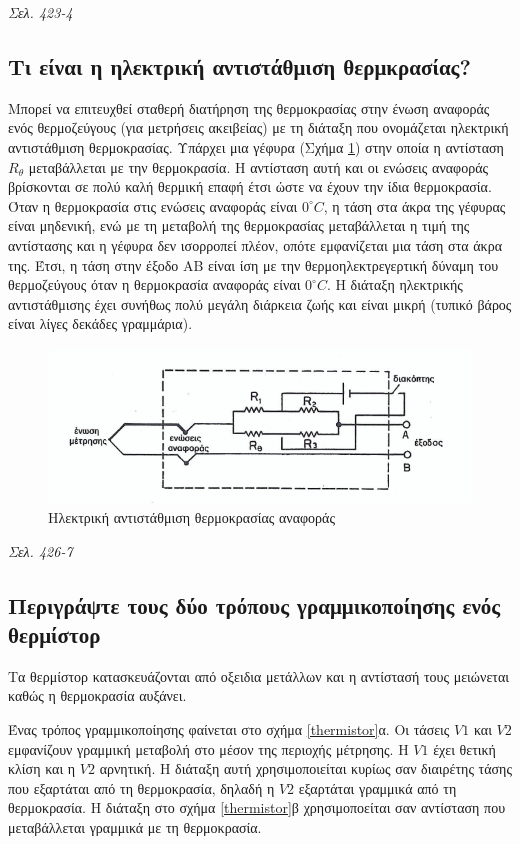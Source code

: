 \documentclass{article}
\begin{document}
\emph{Σελ. 423-4}

\subsection{Τι είναι η ηλεκτρική αντιστάθμιση θερμκρασίας?}
Μπορεί να επιτευχθεί σταθερή διατήρηση της θερμοκρασίας στην ένωση αναφοράς ενός θερμοζεύγους (για μετρήσεις ακειβείας) με τη διάταξη που ονομάζεται ηλεκτρική αντιστάθμιση
θερμοκρασίας. Υπάρχει μια γέφυρα (Σχήμα \ref{antistathmisithermokrasias}) στην οποία η αντίσταση $R_\theta$ μεταβάλλεται με την θερμοκρασία. Η αντίσταση αυτή και οι ενώσεις αναφοράς βρίσκονται σε πολύ
καλή θερμική επαφή έτσι ώστε να έχουν την ίδια θερμοκρασία. Όταν η θερμοκρασία στις ενώσεις αναφοράς είναι $0^\circ C$, η τάση στα άκρα της γέφυρας είναι μηδενική, ενώ
με τη μεταβολή της θερμοκρασίας μεταβάλλεται η τιμή της αντίστασης και η γέφυρα δεν ισορροπεί πλέον, οπότε εμφανίζεται μια τάση στα άκρα της. Έτσι, η τάση στην έξοδο ΑΒ
είναι ίση με την θερμοηλεκτρεγερτική δύναμη του θερμοζεύγους όταν η θερμοκρασία αναφοράς είναι $0^\circ C$. Η διάταξη ηλεκτρικής αντιστάθμισης έχει συνήθως πολύ μεγάλη
διάρκεια ζωής και είναι μικρή (τυπικό βάρος είναι λίγες δεκάδες γραμμάρια).

\begin{figure}[h!]
    \includegraphics[width=\linewidth]{antistathmisithermokrasias.png}
    \caption{Ηλεκτρική αντιστάθμιση θερμοκρασίας αναφοράς}
    \label{antistathmisithermokrasias}
\end{figure}

\emph{Σελ. 426-7}
\subsection{Περιγράψτε τους δύο τρόπους γραμμικοποίησης ενός θερμίστορ}
Τα θερμίστορ κατασκευάζονται από οξειδια μετάλλων και η αντίστασή τους μειώνεται καθώς η θερμοκρασία αυξάνει. 

Ένας τρόπος γραμμικοποίησης φαίνεται στο σχήμα \ref{thermistor}α. Οι τάσεις $V1$ και $V2$ εμφανίζουν γραμμική μεταβολή στο μέσον της περιοχής μέτρησης. Η $V1$ έχει 
θετική κλίση και η $V2$ αρνητική. Η διάταξη αυτή χρησιμοποιείται κυρίως σαν διαιρέτης τάσης που εξαρτάται από τη θερμοκρασία, δηλαδή η $V2$ εξαρτάται γραμμικά από 
τη θερμοκρασία. Η διάταξη στο σχήμα \ref{thermistor}β χρησιμοποείται σαν αντίσταση που μεταβάλλεται γραμμικά με τη θερμοκρασία.
\end{document}
